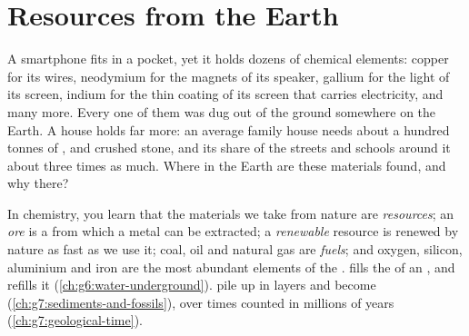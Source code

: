 \chapter{Resources from the Earth}\label{ch:g9:earth-resources}

A smartphone fits in a pocket, yet it holds dozens of chemical elements:
copper for its wires, neodymium for the magnets of its speaker, gallium
for the light of its screen, indium for the thin coating of its screen
that carries electricity, and many more. Every one of them was dug out of the ground
somewhere on the Earth. A house holds far more: an average family house
needs about a hundred tonnes of ,  and crushed stone, and its
share of the streets and schools around it about three times as much.
Where in the Earth are these materials found, and why there?

\begin{recall}
In chemistry, you learn that the materials we take from nature are
\emph{resources}; an \emph{ore} is a  from which a metal can be
extracted; a \emph{renewable} resource is renewed by nature as fast as we
use it; coal, oil and natural gas are \emph{ fuels}; and oxygen,
silicon, aluminium and iron are the most abundant elements of the .
 fills the  of an , and  refills it
(\cref{ch:g6:water-underground}).  pile up in layers and become
 (\cref{ch:g7:sediments-and-fossils}), over times counted
in millions of years (\cref{ch:g7:geological-time}).
\end{recall}

